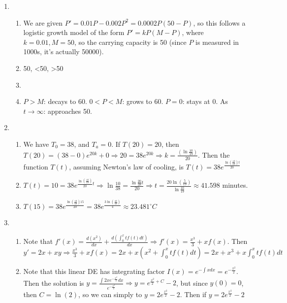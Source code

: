 \documentclass[10pt,english]{article}
\begin{document}
\begin{enumerate}
\pagebreak
\item \begin{enumerate}
    \item We are given $P'=0.01P-0.002P^2=0.0002P(50-P)$, so this follows a logistic growth model of the form $P'=kP(M-P)$, where $k=0.01,M=50$, so the carrying capacity is 50 (since $P$ is measured in 1000s, it's actually 50000).
    \item 50, <50, >50
    \item 
    \item $P>M$: decays to 60. $0<P<M$: grows to 60. $P=0$: stays at 0. As $t\rightarrow\infty$: approaches 50.
\end{enumerate}

\pagebreak
\item \begin{enumerate}
    \item We have $T_0=38$, and $T_a=0$. If $T(20)=20$, then $T(20)=(38-0)e^{20k}+0\Rightarrow 20=38e^{20k}\Rightarrow k=\frac{\left(\ln\frac{10}{19}\right)}{20}$. Then the function $T(t)$, assuming Newton's law of cooling, is $T(t)=38e^{\frac{\ln\left(\frac{10}{19}\right)t}{20}}$
    
    \item $T(t)=10=38e^{\frac{\ln\left(\frac{10}{19}\right)}{20}t}\Rightarrow \ln\frac{10}{38}=\frac{\ln\frac{20}{38}t}{20}\Rightarrow t=\frac{20\ln(\frac{5}{19})}{\ln\frac{10}{19}}\approx41.598$ minutes. 
    
    \item $T(15)=38e^{\frac{\ln\left(\frac{10}{19}\right)15}{20}}=38e^{\frac{3\ln(\frac{10}{19})}{4}}\approx23.481^\circ C$
    
\end{enumerate}

\pagebreak
\item \begin{enumerate}
    \item Note that $f'(x)=\frac{d(x^2)}{dx}+\frac{d\left(\int_0^xtf(t)dt\right)}{dx}\Rightarrow f'(x)=\frac{x^3}{3}+xf(x)$. Then $y'=2x+xy\Rightarrow \frac{x^3}{3}+xf(x)=2x+x(x^2+\int_0^xtf(t)dt)=2x+x^3+x\int_0^xtf(t)dt$
    \item Note that this linear DE has integrating factor $I(x)=e^{-\int xdx}=e^{-\frac{x^2}{2}}$. Then the solution is $y=\frac{\int2xe^{-\frac{x^2}{2}}dx}{e^{-\frac{x^2}{2}}}\Rightarrow y=e^{\frac{x^2}{2}+C}-2$, but since $y(0)=0$, then $C=\ln(2)$, so we can simply to $y=2e^\frac{x^2}{2}-2$. Then if $y=2e^\frac{x^2}{2}-2$
\end{enumerate}

\end{enumerate}
\end{document}
